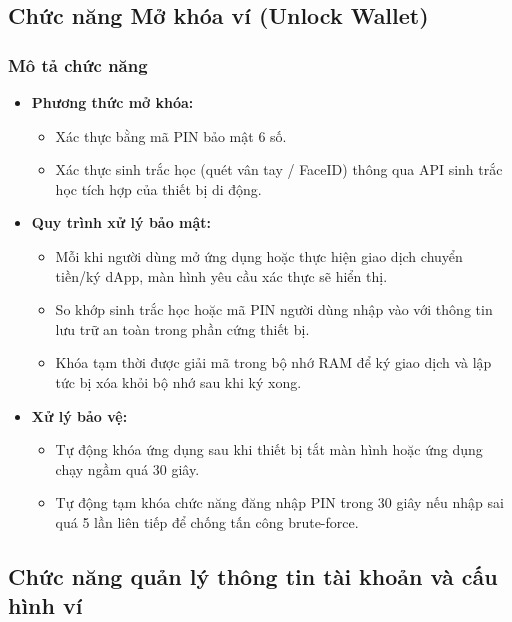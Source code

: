\documentclass[a4paper]{report}
\begin{document}
\subsection{Chức năng Mở khóa ví (Unlock Wallet)}

\subsubsection{Mô tả chức năng}

\begin{itemize}
    \item \textbf{Phương thức mở khóa:}
    \begin{itemize}
        \item Xác thực bằng mã PIN bảo mật 6 số.
        \item Xác thực sinh trắc học (quét vân tay / FaceID) thông qua API sinh trắc học tích hợp của thiết bị di động.
    \end{itemize}
    
    \item \textbf{Quy trình xử lý bảo mật:}
    \begin{itemize}
        \item Mỗi khi người dùng mở ứng dụng hoặc thực hiện giao dịch chuyển tiền/ký dApp, màn hình yêu cầu xác thực sẽ hiển thị.
        \item So khớp sinh trắc học hoặc mã PIN người dùng nhập vào với thông tin lưu trữ an toàn trong phần cứng thiết bị.
        \item Khóa tạm thời được giải mã trong bộ nhớ RAM để ký giao dịch và lập tức bị xóa khỏi bộ nhớ sau khi ký xong.
    \end{itemize}
    
    \item \textbf{Xử lý bảo vệ:}
    \begin{itemize}
        \item Tự động khóa ứng dụng sau khi thiết bị tắt màn hình hoặc ứng dụng chạy ngầm quá 30 giây.
        \item Tự động tạm khóa chức năng đăng nhập PIN trong 30 giây nếu nhập sai quá 5 lần liên tiếp để chống tấn công brute-force.
    \end{itemize}
\end{itemize}

\subsection{Chức năng quản lý thông tin tài khoản và cấu hình ví}
\end{document}
